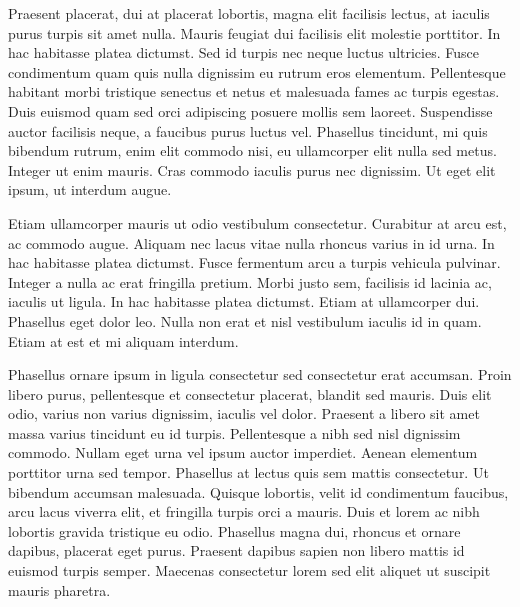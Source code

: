 Praesent placerat, dui at placerat lobortis, magna elit facilisis lectus, at iaculis purus turpis sit amet nulla.
Mauris feugiat dui facilisis elit molestie porttitor.
In hac habitasse platea dictumst.
Sed id turpis nec neque luctus ultricies.
Fusce condimentum quam quis nulla dignissim eu rutrum eros elementum.
Pellentesque habitant morbi tristique senectus et netus et malesuada fames ac turpis egestas.
Duis euismod quam sed orci adipiscing posuere mollis sem laoreet.
Suspendisse auctor facilisis neque, a faucibus purus luctus vel.
Phasellus tincidunt, mi quis bibendum rutrum, enim elit commodo nisi, eu ullamcorper elit nulla sed metus.
Integer ut enim mauris.
Cras commodo iaculis purus nec dignissim.
Ut eget elit ipsum, ut interdum augue.

Etiam ullamcorper mauris ut odio vestibulum consectetur.
Curabitur at arcu est, ac commodo augue.
Aliquam nec lacus vitae nulla rhoncus varius in id urna.
In hac habitasse platea dictumst.
Fusce fermentum arcu a turpis vehicula pulvinar.
Integer a nulla ac erat fringilla pretium.
Morbi justo sem, facilisis id lacinia ac, iaculis ut ligula.
In hac habitasse platea dictumst.
Etiam at ullamcorper dui.
Phasellus eget dolor leo.
Nulla non erat et nisl vestibulum iaculis id in quam.
Etiam at est et mi aliquam interdum.

Phasellus ornare ipsum in ligula consectetur sed consectetur erat accumsan.
Proin libero purus, pellentesque et consectetur placerat, blandit sed mauris.
Duis elit odio, varius non varius dignissim, iaculis vel dolor.
Praesent a libero sit amet massa varius tincidunt eu id turpis.
Pellentesque a nibh sed nisl dignissim commodo.
Nullam eget urna vel ipsum auctor imperdiet.
Aenean elementum porttitor urna sed tempor.
Phasellus at lectus quis sem mattis consectetur.
Ut bibendum accumsan malesuada.
Quisque lobortis, velit id condimentum faucibus, arcu lacus viverra elit, et fringilla turpis orci a mauris.
Duis et lorem ac nibh lobortis gravida tristique eu odio.
Phasellus magna dui, rhoncus et ornare dapibus, placerat eget purus.
Praesent dapibus sapien non libero mattis id euismod turpis semper.
Maecenas consectetur lorem sed elit aliquet ut suscipit mauris pharetra.
